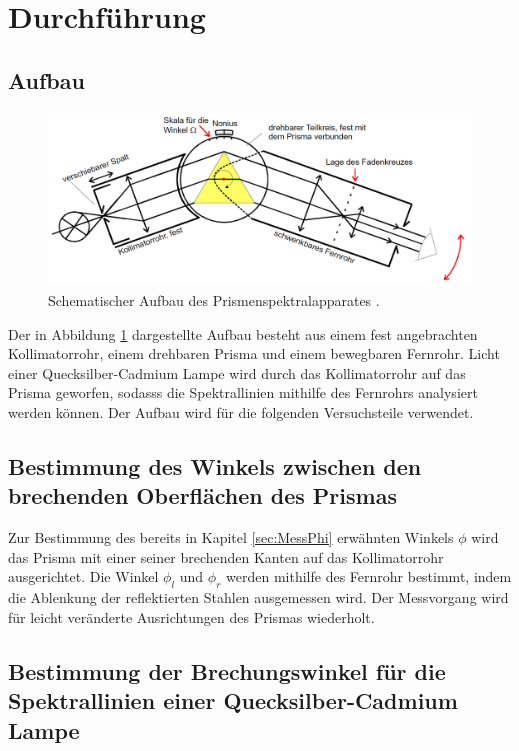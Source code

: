 \section{Durchführung}
\label{sec:Durchführung}

\subsection{Aufbau}
\label{sec:Aufbau}

\begin{figure}[H]
\centering
\includegraphics[width=\linewidth-30pt,height=\textheight-30pt,keepaspectratio]{Text/Bilder/Aufbau.png}
\caption{Schematischer Aufbau des Prismenspektralapparates \cite[24]{sample}.}
\label{fig:aufbau}
\end{figure}

Der in Abbildung \ref{fig:aufbau} dargestellte Aufbau besteht aus einem fest angebrachten Kollimatorrohr, einem drehbaren Prisma und einem bewegbaren Fernrohr.
Licht einer Quecksilber-Cadmium Lampe wird durch das Kollimatorrohr auf das Prisma geworfen, sodasss die Spektrallinien mithilfe des Fernrohrs analysiert werden können.
Der Aufbau wird für die folgenden Versuchsteile verwendet.

\subsection{Bestimmung des Winkels zwischen den brechenden Oberflächen des Prismas}

Zur Bestimmung des bereits in Kapitel \ref{sec:MessPhi} erwähnten Winkels $\phi$  wird das Prisma mit einer seiner brechenden Kanten auf das Kollimatorrohr ausgerichtet.
Die Winkel  $\phi_l$ und $\phi_r$ werden mithilfe des Fernrohr bestimmt, indem die Ablenkung der reflektierten Stahlen ausgemessen wird.
Der Messvorgang wird für leicht veränderte Ausrichtungen des Prismas wiederholt.

\subsection{Bestimmung der Brechungswinkel für die Spektrallinien einer Quecksilber-Cadmium Lampe}

